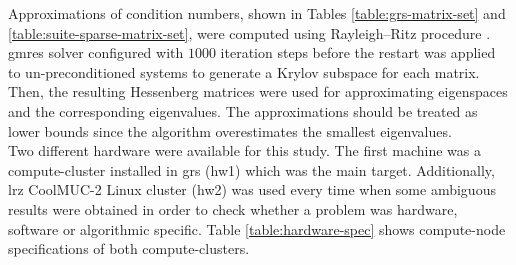 Approximations of condition numbers, shown in Tables \ref{table:grs-matrix-set} and \ref{table:suite-sparse-matrix-set},  were computed using Rayleigh–Ritz procedure \cite{rayleigh-ritz-procedure}. \acrshort{gmres} solver configured with $1000$ iteration steps before the restart was applied to un-preconditioned systems to generate a Krylov subspace for each matrix. Then, the resulting Hessenberg matrices were used for approximating eigenspaces and the corresponding eigenvalues. The approximations should be treated as lower bounds since the algorithm overestimates the smallest eigenvalues.\\




Two different hardware were available for this study. The first machine was a compute-cluster installed in \acrshort{grs} (\gls{hw1}) which was the main target. Additionally, \acrshort{lrz} CoolMUC-2 Linux cluster (\gls{hw2}) was used every time when some ambiguous results were obtained in order to check whether a problem was hardware, software or algorithmic specific. Table \ref{table:hardware-spec} shows compute-node specifications of both compute-clusters.\\


